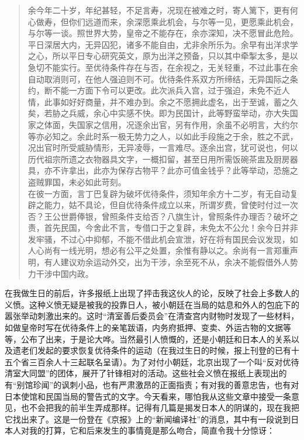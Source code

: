 \begin{quote}
	余今年二十岁，年纪甚轻，不足言寿，况现在被难之时，寄人篱下，更有何心做寿，但你们远道而来，余深愿乘此机会，与尔等一见，更愿乘此机会，与尔等一谈。照世界大势，皇帝之不能存在，余亦深知，决不愿冒此危险。平日深居大内，无异囚犯，诸多不能自由，尤非余所乐为。余早有出洋求学之心，所以平日专心研究英文，原为出洋之预备，只以其中牵掣太多，是以急切不能实行。至优待条件存在与否，在余视之，无关轻重，不过此事在余自动取消则可，在他人强迫则不可。优待条件系双方所缔结，无异国际之条约，断不能一方面下令可以更改。此次派兵入宫，过于强迫，未免不近人情，此事如好好商量，并不难办到。余之不愿拥此虚名，出于至诚，蓄之久矣，若胁之兵威，余心中实感不快。即为民国计，此等野蛮举动，亦大失国家之体面，失国家之信用，况逐余出官，另有作用，余虽不必明言，大约尔等亦必知之。余此时系一极无势力之人，以如此手段施之于余，胜之不武，况出官时所受威胁情形，无异凌辱，一言难尽。逐余出宫，犹可说也，何以历代祖宗所遗之衣物器具文字，一概扣留，甚至日用所需饭碗茶盅及厨房器具，亦不许拿出，此亦为保存古物平？此亦可值金钱乎？此等举动，恐施之盗贼罪国，未必如此苛刻。\\

在彼一方面，言丁巴复辟为破坏优待条件，须知年余方十二岁，有无自动复辟之能力，姑不具论，但自优待条件成立以来，所谓岁费，曾使时付过一次否？王公世爵俸银，曾照条件支给否？八旗生计，曾照条件办理否？破坏之责，首先民国，今舍此不言，专借口于之复辟，未免太不公允！余今日并非发牢骚，不过心中抑郁，不能不借此机会宣泄，好在将有国民会议发现，如人心尚有一线光明，想必有公平之处置，余惟有静以之。余尚有一言郑重声明，有人建议劝余运动外交，出为干涉，余至死不从，余决不能假借外人势力干涉中国内政。\\
\end{quote}

在我做生日的前后，许多报纸上出现了抨击我这伙人的论，反映了社会上多数人的义愤。这种义愤无疑是被我的投靠日人，被小朝廷在当局的姑息和外人的包庇下的嚣张举动刺激出来的。这时“清室善后委员会”在清查宫内财物时发现了一些材料，如做皇帝时写在优待条件上的亲笔跋语，内务府抵押、变卖、外运古物的文据等等，公布了出来，于是论大哗。当然最引人愤慨的，还是小朝廷和日本人的关系以及遗老们发起的要求恢复优待条件的运动（在我过生日的时候，报上刊登的已有十五个省三百余人十三起联名呈请）。为了对付小朝廷，北京出现了一个叫“反对优待清室大同盟”的团体，展开了针锋相对的活动。这些社会义愤在报纸上表现出的有“别馆珍闻”的讽刺小品，也有严肃激昂的正面指责；有对我的善意忠告，也有对日本使馆和民国当局的警告式的文字。今天看来，哪怕我从这些文章中接受一条意见，也不会把我的前半生弄成那样。记得有几篇是揭发日本人的阴谋的，现在我把它找出来了。这是一份登在《京报》上的“新闻编译社”的消息，其中有一段说到日本人对我的打算，它和后来发生的事情竟是那么吻合，简直令我十分惊讶：\\

